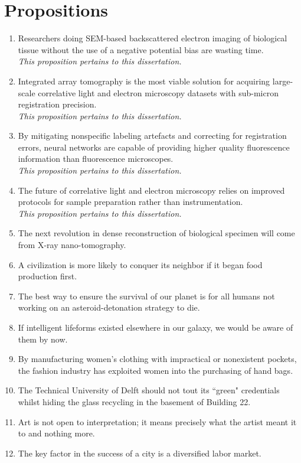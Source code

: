 \section{Propositions}

\begin{enumerate}
    \item Researchers doing SEM-based backscattered electron imaging of biological tissue without the use of a negative potential bias are wasting time. \\
    \textit{This proposition pertains to this dissertation.}
    \item Integrated array tomography is the most viable solution for acquiring large-scale correlative light and electron microscopy datasets with sub-micron registration precision. \\
    \textit{This proposition pertains to this dissertation.}
    \item By mitigating nonspecific labeling artefacts and correcting for registration errors, neural networks are capable of providing higher quality fluorescence information than fluorescence microscopes. \\
    \textit{This proposition pertains to this dissertation.}
    \item The future of correlative light and electron microscopy relies on improved protocols for sample preparation rather than instrumentation. \\
    \textit{This proposition pertains to this dissertation.}
    \item The next revolution in dense reconstruction of biological specimen will come from X-ray nano-tomography.
    \item A civilization is more likely to conquer its neighbor if it began food production first.
    \item The best way to ensure the survival of our planet is for all humans not working on an asteroid-detonation strategy to die.
    \item If intelligent lifeforms existed elsewhere in our galaxy, we would be aware of them by now.
    \item By manufacturing women's clothing with impractical or nonexistent pockets, the fashion industry has exploited women into the purchasing of hand bags.
    \item The Technical University of Delft should not tout its ``green" credentials whilst hiding the glass recycling in the basement of Building 22.
    \item Art is not open to interpretation; it means precisely what the artist meant it to and nothing more.
    \item The key factor in the success of a city is a diversified labor market.
\end{enumerate}
